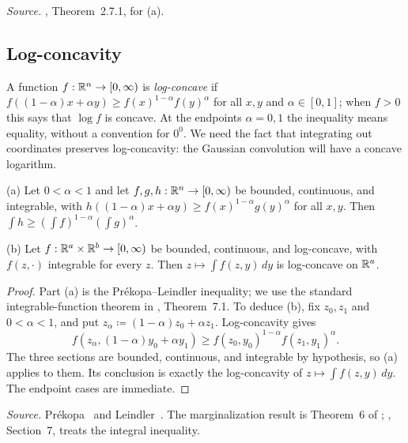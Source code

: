 \emph{Source.} , Theorem~2.7.1, for (a).

\subsection{Log-concavity}\label{tb:sec:logconcave}

A function \(f:\mathbb R^n\to[0,\infty)\) is \emph{log-concave} if
\(f((1-\alpha)x+\alpha y)\ge f(x)^{1-\alpha}f(y)^\alpha\) for all \(x,y\) and \(\alpha\in[0,1]\);
when \(f>0\) this says that \(\log f\) is concave. At the endpoints
\(\alpha=0,1\) the inequality means equality, without a convention
for \(0^0\). We need the fact that integrating out coordinates
preserves log-concavity: the Gaussian convolution will have a
concave logarithm.

\begin{fact}
\label{tb:prekopa}
(a) Let \(0<\alpha<1\) and let \(f,g,h:\mathbb R^n\to[0,\infty)\) be bounded,
continuous, and integrable, with
\(h((1-\alpha)x+\alpha y)\ge f(x)^{1-\alpha}g(y)^\alpha\) for all \(x,y\). Then
\(\int h\ge(\int f)^{1-\alpha}(\int g)^\alpha\).

(b) Let \(f:\mathbb R^a\times\mathbb R^b\to[0,\infty)\) be bounded, continuous, and
log-concave, with \(f(z,\cdot)\) integrable for every \(z\). Then
\(z\mapsto\int f(z,y)\,dy\) is log-concave on \(\mathbb R^a\).
\end{fact}

\begin{proof}
Part (a) is the Pr\'ekopa--Leindler inequality; we use the standard
integrable-function theorem in , Theorem~7.1.
To deduce (b), fix \(z_0,z_1\) and \(0<\alpha<1\), and put
\(z_\alpha\coloneqq(1-\alpha)z_0+\alpha z_1\).
Log-concavity gives
\[
 f(z_\alpha,(1-\alpha)y_0+\alpha y_1)
 \ge f(z_0,y_0)^{1-\alpha}f(z_1,y_1)^\alpha.
\]
The three sections are bounded, continuous, and integrable by hypothesis,
so (a) applies to them. Its conclusion is exactly the log-concavity of
\(z\mapsto\int f(z,y)\,dy\). The endpoint cases are immediate.
\end{proof}

\emph{Source.} Pr\'ekopa~ and Leindler~.
The marginalization result is Theorem~6 of ;
, Section~7, treats the integral inequality.

